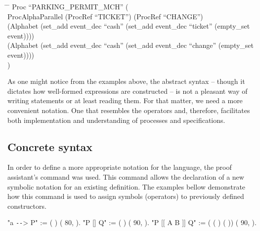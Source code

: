 \begin{tabbing}
	\hspace*{1em}\= \hspace*{2em} \= \kill
	Proc ``PARKING\_PERMIT\_MCH'' (\\
	\>	ProcAlphaParallel (ProcRef ``TICKET'') (ProcRef ``CHANGE'')\\
	\>	(Alphabet (set\_add event\_dec ``cash'' (set\_add event\_dec ``ticket'' (empty\_set event))))\\
	\>	(Alphabet (set\_add event\_dec ``cash'' (set\_add event\_dec ``change'' (empty\_set event))))\\
	)
\end{tabbing}

As one might notice from the examples above, the abstract syntax -- though it dictates how well-formed expressions are constructed -- is not a pleasant way of writing statements or at least reading them. For that matter, we need a more convenient notation. One that resembles the \CSPM{} operators and, therefore, facilitates both implementation and understanding of \CSPcoq{} processes and specifications.

\subsection{Concrete syntax}

In order to define a more appropriate notation for the \CSPcoq{} language, the proof assistant's  command was used. This command allows the declaration of a new symbolic notation for an existing definition. The examples bellow demonstrate how this command is used to assign symbols (operators) to previously defined constructors.

\begin{coqdoccode}
	\coqdocnoindent
	 "a \texttt{-{}-}> P" := (  ) (  80,  ).\coqdoceol
	\coqdocnoindent
	 "P [] Q" := (  ) (  90,  ).\coqdoceol
	\coqdocnoindent
	 "P [[ A  B ]] Q" := (   ( ) ( )) (  90,  ).\coqdoceol
\end{coqdoccode}

